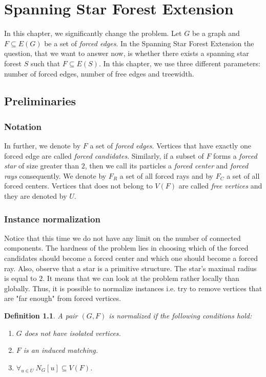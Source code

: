 \documentclass[en]{pracamgr}
\newtheorem{definition}{Definition}
\newcommand{\ssf}{spanning star forest}
\newcommand{\ssfep}{{\sc Spanning Star Forest Extension}}
\begin{document}
\fi

\chapter{Spanning Star Forest Extension}

In this chapter, we significantly change the problem. Let $G$ be a graph and $F \subseteq E(G)$ be a set of \emph{forced edges}. In the \ssfep{} the question, that we want to answer now, is whether there exists a \ssf{} $S$ such that $F \subseteq E(S)$. In this chapter, we use three different parameters: number of forced edges, number of free edges and treewidth. 

\section{Preliminaries}

\subsection{Notation}

In further, we denote by $F$ a set of \emph{forced edges}. Vertices that have exactly one forced edge are called \emph{forced candidates}. Similarly, if a subset of $F$ forms a \emph{forced star} of size greater than $2$, then we call its particles a \emph{forced center} and \emph{forced rays} consequently. We denote by $F_R$ a set of all forced rays and by $F_C$ a set of all forced centers. Vertices that does not belong to $V(F)$ are called \emph{free vertices} and they are denoted by $U$.

\subsection{Instance normalization} 

Notice that this time we do not have any limit on the number of connected components. The hardness of the problem lies in choosing which of the forced candidates should become a forced center and which one should become a forced ray. Also, observe that a star is a primitive structure. The star's maximal radius is equal to $2$. It means that we can look at the problem rather locally than globally. Thus, it is possible to normalize instances i.e. try to remove vertices that are "far enough" from forced vertices.

\begin{definition}\label{norm-ssfe}
	A pair $(G,F)$ is normalized if the following conditions hold:
	\begin{enumerate}
		\item $G$ does not have isolated vertices.
		\item $F$ is an induced matching.
		\item $\forall_{u \in U}\ N_G[u] \subseteq V(F)$.
	\end{enumerate}
\end{definition}
\end{document}
